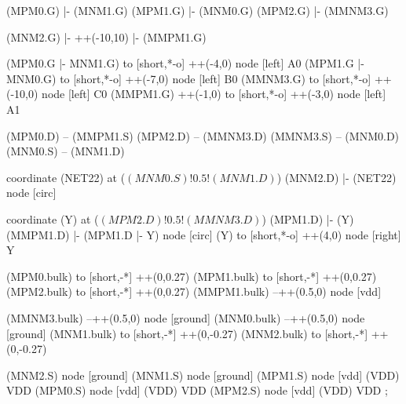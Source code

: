 \begin{circuitikz}[american]
	(MPM0.G) |- (MNM1.G)
	(MPM1.G) |- (MNM0.G)
	(MPM2.G) |- (MMNM3.G)
	
	(MNM2.G) |- ++(-10,10) |- (MMPM1.G)
	
	(MPM0.G |- MNM1.G) to [short,*-o] ++(-4,0) node [left] {A0}
	(MPM1.G |- MNM0.G) to [short,*-o] ++(-7,0) node [left] {B0}
	(MMNM3.G) to [short,*-o] ++(-10,0) node [left] {C0}
	(MMPM1.G) ++(-1,0) to [short,*-o] ++(-3,0) node [left] {A1}
	
	(MPM0.D) -- (MMPM1.S)
	(MPM2.D) -- (MMNM3.D)
	(MMNM3.S) -- (MNM0.D)
	(MNM0.S) -- (MNM1.D)
	
	coordinate (NET22) at ($(MNM0.S)!0.5!(MNM1.D)$)
	(MNM2.D) |- (NET22) node [circ] {}
	
	coordinate (Y) at ($(MPM2.D)!0.5!(MMNM3.D)$)
	(MPM1.D) |- (Y)
	(MMPM1.D) |- (MPM1.D |- Y) node [circ] {}
	(Y) to [short,*-o] ++(4,0) node [right] {Y}
	
	(MPM0.bulk) to [short,-*] ++(0,0.27)
	(MPM1.bulk) to [short,-*] ++(0,0.27)	
	(MPM2.bulk) to [short,-*] ++(0,0.27)	
	(MMPM1.bulk) --++(0.5,0) node [vdd]{}
	
	(MMNM3.bulk) --++(0.5,0) node [ground]{}
	(MNM0.bulk) --++(0.5,0) node [ground]{}
	(MNM1.bulk) to [short,-*] ++(0,-0.27) 
	(MNM2.bulk) to [short,-*] ++(0,-0.27)


	(MNM2.S) node [ground] {}
	(MNM1.S) node [ground] {}
	(MPM1.S) node [vdd] (VDD) {VDD}
	(MPM0.S) node [vdd] (VDD) {VDD}
	(MPM2.S) node [vdd] (VDD) {VDD}
;

\end{circuitikz}
